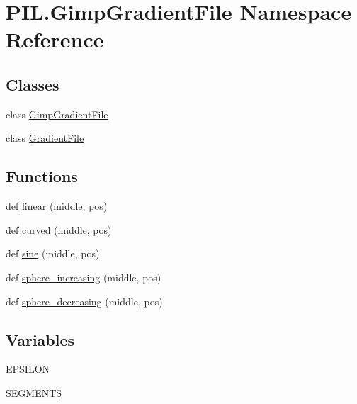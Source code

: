 \hypertarget{namespacePIL_1_1GimpGradientFile}{}\section{P\+I\+L.\+Gimp\+Gradient\+File Namespace Reference}
\label{namespacePIL_1_1GimpGradientFile}
\subsection*{Classes}
\begin{DoxyCompactItemize}
\item 
class \hyperlink{classPIL_1_1GimpGradientFile_1_1GimpGradientFile}{Gimp\+Gradient\+File}
\item 
class \hyperlink{classPIL_1_1GimpGradientFile_1_1GradientFile}{Gradient\+File}
\end{DoxyCompactItemize}
\subsection*{Functions}
\begin{DoxyCompactItemize}
\item 
def \hyperlink{namespacePIL_1_1GimpGradientFile_a47c7fe496e53c8c078d0962b3ea54e6c}{linear} (middle, pos)
\item 
def \hyperlink{namespacePIL_1_1GimpGradientFile_a2fa48fc31ad1ad7912844f0e34b11fe7}{curved} (middle, pos)
\item 
def \hyperlink{namespacePIL_1_1GimpGradientFile_ab563254f25e31316db0d183bda7deadd}{sine} (middle, pos)
\item 
def \hyperlink{namespacePIL_1_1GimpGradientFile_aed53917e05a4b06483fb47e7ee38cd76}{sphere\+\_\+increasing} (middle, pos)
\item 
def \hyperlink{namespacePIL_1_1GimpGradientFile_a91cc6f50b2e76ee12d6d46e915d15548}{sphere\+\_\+decreasing} (middle, pos)
\end{DoxyCompactItemize}
\subsection*{Variables}
\begin{DoxyCompactItemize}
\item 
\hyperlink{namespacePIL_1_1GimpGradientFile_a3b07c7a831644f4b0336a9e5a5457184}{E\+P\+S\+I\+L\+ON}
\item 
\hyperlink{namespacePIL_1_1GimpGradientFile_a2b425f2dffb67cbe7d4470ce01e8f09c}{S\+E\+G\+M\+E\+N\+TS}
\end{DoxyCompactItemize}


